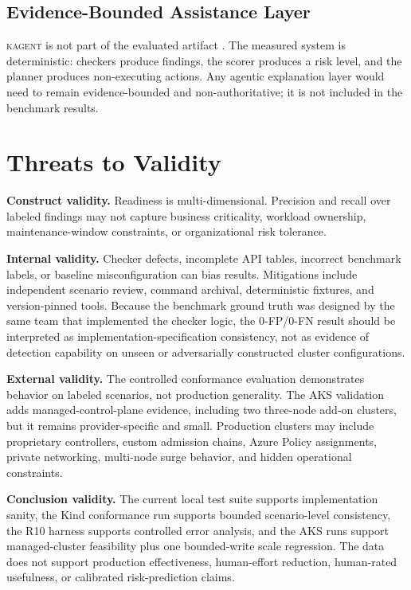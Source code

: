 \documentclass[10pt,journal]{IEEEtran}
\newcommand{\kagent}{\textsc{kagent}}
\begin{document}
\subsection{Evidence-Bounded Assistance Layer}
\kagent{} is not part of the evaluated artifact \cite{kagent}. The measured system is deterministic: checkers produce findings, the scorer produces a risk level, and the planner produces non-executing actions. Any agentic explanation layer would need to remain evidence-bounded and non-authoritative; it is not included in the benchmark results.

\section{Threats to Validity}
\textbf{Construct validity.} Readiness is multi-dimensional. Precision and recall over labeled findings may not capture business criticality, workload ownership, maintenance-window constraints, or organizational risk tolerance.

\textbf{Internal validity.} Checker defects, incomplete API tables, incorrect benchmark labels, or baseline misconfiguration can bias results. Mitigations include independent scenario review, command archival, deterministic fixtures, and version-pinned tools. Because the benchmark ground truth was designed by the same team that implemented the checker logic, the 0-FP/0-FN result should be interpreted as implementation-specification consistency, not as evidence of detection capability on unseen or adversarially constructed cluster configurations.

\textbf{External validity.} The controlled conformance evaluation demonstrates behavior on labeled scenarios, not production generality. The AKS validation adds managed-control-plane evidence, including two three-node add-on clusters, but it remains provider-specific and small. Production clusters may include proprietary controllers, custom admission chains, Azure Policy assignments, private networking, multi-node surge behavior, and hidden operational constraints.

\textbf{Conclusion validity.} The current local test suite supports implementation sanity, the Kind conformance run supports bounded scenario-level consistency, the R10 harness supports controlled error analysis, and the AKS runs support managed-cluster feasibility plus one bounded-write scale regression. The data does not support production effectiveness, human-effort reduction, human-rated usefulness, or calibrated risk-prediction claims.
\end{document}
